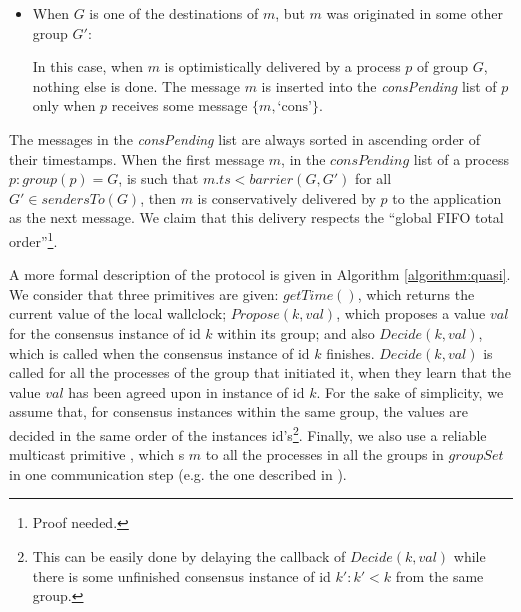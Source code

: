 \documentclass[times, 10pt]{article}
\begin{document}
\begin{itemize}
  \item When $G$ is one of the destinations of $m$, but $m$ was originated in some other group $G'$:
  
  In this case, when $m$ is optimistically delivered by a process $p$ of group $G$, nothing else is done. The message $m$ is inserted into the \mbox{\textit{consPending}} list of $p$ only when $p$ receives some message $\{m, \text{`cons'}\}$.
\end{itemize}

The messages in the \textit{consPending} list are always sorted in ascending order of their timestamps. When the first message $m$, in the $consPending$ list of a process $p : group(p) = G$, is such that $m.ts < barrier(G, G')$ for all $G' \in sendersTo(G)$, then $m$ is conservatively delivered by $p$ to the application as the next message. We claim that this delivery respects the ``global FIFO total order''\footnote{Proof needed.}.


A more formal description of the protocol is given in Algorithm \ref{algorithm:quasi}. We consider that three primitives are given: $getTime()$, which returns the current value of the local wallclock; $Propose(k, val)$, which proposes a value $val$ for the consensus instance of id $k$ within its group; and also $Decide(k, val)$, which is called when the consensus instance of id $k$ finishes. $Decide(k, val)$ is called for all the processes of the group that initiated it, when they learn that the value $val$ has been agreed upon in instance of id $k$. For the sake of simplicity, we assume that, for consensus instances within the same group, the values are decided in the same order of the instances id's\footnote{This can be easily done by delaying the callback of $Decide(k, val)$ while there is some unfinished consensus instance of id $k': k' < k$ from the same group.}. Finally, we also use a reliable multicast primitive , which \rmd{}s $m$ to all the processes in all the groups in $groupSet$ in one communication step (e.g. the one described in \cite{urmcast1delta}).
\end{document}
